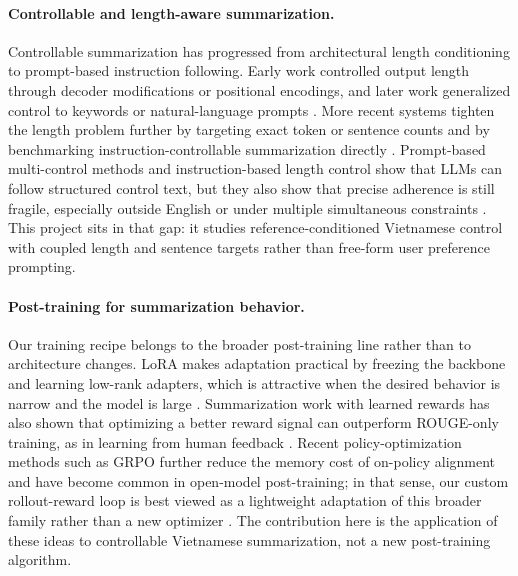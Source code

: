 \documentclass[11pt]{article}
\begin{document}
\paragraph{Controllable and length-aware summarization.}
Controllable summarization has progressed from architectural length conditioning to prompt-based instruction following.
Early work controlled output length through decoder modifications or positional encodings, and later work generalized control to keywords or natural-language prompts \citep{kikuchi2016controlling,fan2018controllable,takase2019positional,he2020ctrlsum,chan2021cmdp}.
More recent systems tighten the length problem further by targeting exact token or sentence counts and by benchmarking instruction-controllable summarization directly \citep{miculicich2023precise,liu2023instrusum}.
Prompt-based multi-control methods and instruction-based length control show that LLMs can follow structured control text, but they also show that precise adherence is still fragile, especially outside English or under multiple simultaneous constraints \citep{jie2024lengthcontrol,instructcmp2024}.
This project sits in that gap: it studies reference-conditioned Vietnamese control with coupled length and sentence targets rather than free-form user preference prompting.

\paragraph{Post-training for summarization behavior.}
Our training recipe belongs to the broader post-training line rather than to architecture changes.
LoRA makes adaptation practical by freezing the backbone and learning low-rank adapters, which is attractive when the desired behavior is narrow and the model is large \citep{hu2021lora}.
Summarization work with learned rewards has also shown that optimizing a better reward signal can outperform ROUGE-only training, as in learning from human feedback \citep{stiennon2020summarize,bohm2019betterrewards}.
Recent policy-optimization methods such as GRPO further reduce the memory cost of on-policy alignment and have become common in open-model post-training; in that sense, our custom rollout-reward loop is best viewed as a lightweight adaptation of this broader family rather than a new optimizer \citep{shao2024deepseekmath}.
The contribution here is the application of these ideas to controllable Vietnamese summarization, not a new post-training algorithm.
\end{document}
